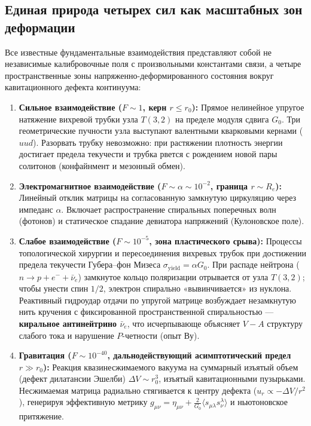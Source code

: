 \documentclass[11pt,a4paper]{article}
\theoremstyle{definition}
\theoremstyle{remark}
\begin{document}
\subsection{Единая природа четырех сил как масштабных зон деформации}
Все известные фундаментальные взаимодействия представляют собой не независимые калибровочные поля с произвольными константами связи, а четыре пространственные зоны напряженно-деформированного состояния вокруг кавитационного дефекта континуума:

\begin{enumerate}
    \item \textbf{Сильное взаимодействие ($F \sim 1$, керн $r \le r_0$):} Прямое нелинейное упругое натяжение вихревой трубки узла $T(3,2)$ на пределе модуля сдвига $G_0$. Три геометрические пучности узла выступают валентными кварковыми кернами ($uud$). Разорвать трубку невозможно: при растяжении плотность энергии достигает предела текучести и трубка рвется с рождением новой пары солитонов (конфайнмент и мезонный обмен).
    
    \item \textbf{Электромагнитное взаимодействие ($F \sim \alpha \sim 10^{-2}$, граница $r \sim R_e$):} Линейный отклик матрицы на согласованную замкнутую циркуляцию через импеданс $\alpha$. Включает распространение спиральных поперечных волн (фотонов) и статическое спадание девиатора напряжений (Кулоновское поле).
    
    \item \textbf{Слабое взаимодействие ($F \sim 10^{-5}$, зона пластического срыва):} Процессы топологической хирургии и пересоединения вихревых трубок при достижении предела текучести Губера--фон Мизеса $\sigma_{\mathrm{yield}} = \alpha G_0$. При распаде нейтрона ($n \to p + e^- + \bar{\nu}_e$) замкнутое кольцо поляризации отрывается от узла $T(3,2)$; чтобы унести спин $1/2$, электрон спирально «вывинчивается» из нуклона. Реактивный гидроудар отдачи по упругой матрице возбуждает незамкнутую нить кручения с фиксированной пространственной спиральностью — \textbf{киральное антинейтрино $\bar{\nu}_e$}, что исчерпывающе объясняет $V-A$ структуру слабого тока и нарушение $P$-четности (опыт Ву).
    
    \item \textbf{Гравитация ($F \sim 10^{-40}$, дальнодействующий асимптотический предел $r \gg r_0$):} Реакция квазинесжимаемого вакуума на суммарный изъятый объем (дефект дилатансии Эшелби) $\Delta V \sim r_0^3$, изъятый кавитационными пузырьками. Несжимаемая матрица радиально стягивается к центру дефекта ($u_r \propto -\Delta V / r^2$), генерируя эффективную метрику $g_{\mu\nu} = \eta_{\mu\nu} + \frac{2}{G_0}\langle s_{\mu\lambda}s^\lambda_\nu\rangle$ и ньютоновское притяжение.
\end{enumerate}
\end{document}
